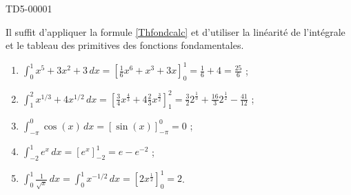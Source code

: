 
\begin{corrige}{TD5-00001}

    Il suffit d'appliquer la formule \eqref{Thfondcalc} et d'utiliser la linéarité de l'intégrale et le tableau des primitives des fonctions fondamentales. 
  \begin{enumerate}
  \item $\displaystyle \int_0^1 x^5+3x^2+3 \, dx = \left[\frac{1}{6} x^6 + x^3 +3x \right]_0^1 = \frac{1}{6}+4 = \frac{25}{6} $ ;
  \item $\displaystyle \int_1^2 x^{1/3}+4x^{1/2} \, dx  = \left[\frac{3}{4} x^{\frac{4}{3}} + 4 \frac{2}{3} x^{\frac{3}{2}} \right]_1^2 =\frac{3}{2} 2^{\frac{1}{3}} + \frac{16}{3} 2^{\frac{1}{2}} - \frac{41}{12} $ ;
  \item $\displaystyle \int_{-\pi}^{0} \cos(x) \, dx  = \left[\sin(x) \right]_{-\pi}^0  = 0$ ;
  \item $\displaystyle \int_{-2}^{1} e^x \, dx = \left[e^x \right]_{-2}^{1} = e - e^{-2} $ ;
  \item $\displaystyle \int_{0}^{1} \frac{1}{\sqrt{x}} \, dx =\int_{0}^{1} x^{-1/2} \, dx  = \left[2x^{\frac{1}{2}}  \right]_0^1  = 2$.
  \end{enumerate}
\end{corrige}
